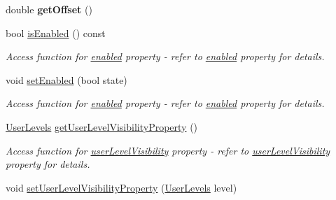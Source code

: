 \begin{DoxyCompactItemize}
\item 
\hypertarget{classQESlider_a0dfab3a9804c0dad616fc3f5f284ab92}{
double {\bfseries getOffset} ()}
\label{classQESlider_a0dfab3a9804c0dad616fc3f5f284ab92}

\item 
\hypertarget{classQESlider_ad5eec328caf2b75a1167d6c183e0d7a9}{
bool \hyperlink{classQESlider_ad5eec328caf2b75a1167d6c183e0d7a9}{isEnabled} () const }
\label{classQESlider_ad5eec328caf2b75a1167d6c183e0d7a9}

\begin{DoxyCompactList}\small\item\em Access function for \hyperlink{classQESlider_a7443c8c101d387a8d70a66e0e30b96ac}{enabled} property -\/ refer to \hyperlink{classQESlider_a7443c8c101d387a8d70a66e0e30b96ac}{enabled} property for details. \end{DoxyCompactList}\item 
\hypertarget{classQESlider_a49ecedc7f3b2f040340c31e470937b4d}{
void \hyperlink{classQESlider_a49ecedc7f3b2f040340c31e470937b4d}{setEnabled} (bool state)}
\label{classQESlider_a49ecedc7f3b2f040340c31e470937b4d}

\begin{DoxyCompactList}\small\item\em Access function for \hyperlink{classQESlider_a7443c8c101d387a8d70a66e0e30b96ac}{enabled} property -\/ refer to \hyperlink{classQESlider_a7443c8c101d387a8d70a66e0e30b96ac}{enabled} property for details. \end{DoxyCompactList}\item 
\hypertarget{classQESlider_a60faafc9fdaa9e674ddca61cfc8b1d6b}{
\hyperlink{classQESlider_ad8ddcac593e2ec7441ae04ec7c8a7b26}{UserLevels} \hyperlink{classQESlider_a60faafc9fdaa9e674ddca61cfc8b1d6b}{getUserLevelVisibilityProperty} ()}
\label{classQESlider_a60faafc9fdaa9e674ddca61cfc8b1d6b}

\begin{DoxyCompactList}\small\item\em Access function for \hyperlink{classQESlider_a6aea2f373a3b07597dd8db1dcb2803cc}{userLevelVisibility} property -\/ refer to \hyperlink{classQESlider_a6aea2f373a3b07597dd8db1dcb2803cc}{userLevelVisibility} property for details. \end{DoxyCompactList}\item 
\hypertarget{classQESlider_aa1ca2564109acf06e18cd0bec78dd7a1}{
void \hyperlink{classQESlider_aa1ca2564109acf06e18cd0bec78dd7a1}{setUserLevelVisibilityProperty} (\hyperlink{classQESlider_ad8ddcac593e2ec7441ae04ec7c8a7b26}{UserLevels} level)}
\label{classQESlider_aa1ca2564109acf06e18cd0bec78dd7a1}


\end{DoxyCompactItemize}
